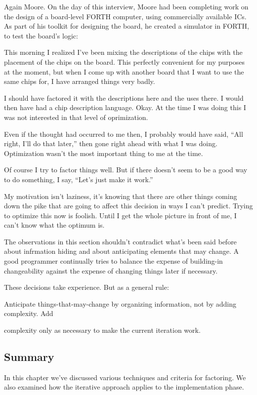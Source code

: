 \blackline{2ex}
Again Moore. On the day of this interview, Moore had been completing work on the design of a board-level FORTH computer, using commercially available ICs. As part of his toolkit for designing the board, he created a simulator in FORTH, to test the board's logic:

\begin{tfquot}
This morning I realized I've been mixing the descriptions of the chips with the placement of the chips on the board. This perfectly convenient for my purposes at the moment, but when I come up with another board that I want to use the same chips for, I have arranged things very badly.

I should have factored it with the descriptions here and the uses there. I would then have had a chip description language. Okay. At the time I was doing this I was not interested in that level of oprimization.

Even if the thought had occurred to me then, I probably would have said, ``All right, I'll do that later,'' then gone right ahead with what I was doing. Optimization wasn't the most important thing to me at the time.

Of course I try to factor things well. But if there doesn't seem to be a good way to do something, I say, ``Let's just make it work.''

My motivation isn't laziness, it's knowing that there are other things coming down the pike that are going to affect this decision in ways I can't predict. Trying to optimize this now is foolish. Until I get the whole picture in front of me, I can't know what the optimum is.
\end{tfquot}
\blackline{1ex}
The observations in this section shouldn't contradict what's been said before about infrmation hiding and about anticipating elements that may change. A good programmer continually tries to balance the expense of building-in changeability against the expense of changing things later if necessary.

These decisions take experience. But as a general rule:

\begin{tip}
Anticipate things-that-may-change by organizing information, not by adding complexity. Add 

complexity only as necessary to make the current iteration work.
\end{tip}

\subsection{Summary}
In this chapter we've discussed various techniques and criteria for factoring. We also examined how the iterative approach applies to the implementation phase.

